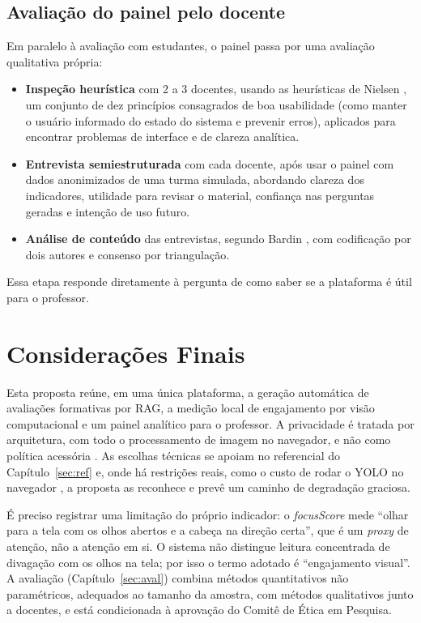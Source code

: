 \documentclass[12pt,a4paper]{article}
\begin{document}
\subsection{Avaliação do painel pelo docente}
Em paralelo à avaliação com estudantes, o painel passa por uma avaliação qualitativa própria:
\begin{itemize}[leftmargin=*]
  \item \textbf{Inspeção heurística} com 2 a 3 docentes, usando as heurísticas de Nielsen \cite{Nie94}, um conjunto de dez princípios consagrados de boa usabilidade (como manter o usuário informado do estado do sistema e prevenir erros), aplicados para encontrar problemas de interface e de clareza analítica.
  \item \textbf{Entrevista semiestruturada} com cada docente, após usar o painel com dados anonimizados de uma turma simulada, abordando clareza dos indicadores, utilidade para revisar o material, confiança nas perguntas geradas e intenção de uso futuro.
  \item \textbf{Análise de conteúdo} das entrevistas, segundo Bardin \cite{Bar11}, com codificação por dois autores e consenso por triangulação.
\end{itemize}
Essa etapa responde diretamente à pergunta de como saber se a plataforma é útil para o professor.

\section{Considerações Finais}

Esta proposta reúne, em uma única plataforma, a geração automática de avaliações formativas por RAG, a medição local de engajamento por visão computacional e um painel analítico para o professor. A privacidade é tratada por arquitetura, com todo o processamento de imagem no navegador, e não como política acessória \cite{HBF19,UNE21}. As escolhas técnicas se apoiam no referencial do Capítulo~\ref{sec:ref} e, onde há restrições reais, como o custo de rodar o YOLO no navegador \cite{JCQ23}, a proposta as reconhece e prevê um caminho de degradação graciosa.

É preciso registrar uma limitação do próprio indicador: o \emph{focusScore} mede ``olhar para a tela com os olhos abertos e a cabeça na direção certa'', que é um \emph{proxy} de atenção, não a atenção em si. O sistema não distingue leitura concentrada de divagação com os olhos na tela; por isso o termo adotado é ``engajamento visual''. A avaliação (Capítulo~\ref{sec:aval}) combina métodos quantitativos não paramétricos, adequados ao tamanho da amostra, com métodos qualitativos junto a docentes, e está condicionada à aprovação do Comitê de Ética em Pesquisa.
\end{document}

